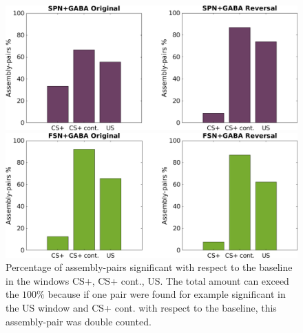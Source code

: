 \begin{figure}
    \centering
    \includegraphics[scale=0.36]{figures/SPN_GABAHisto.png}
    
    \vspace{1cm}
    
    \includegraphics[scale=0.36]{figures/FSN_GABAHisto.png}
    \caption{Percentage of assembly-pairs significant with respect to the baseline in the windows CS+, CS+ cont., US. The total amount can exceed the $100\%$ because if one pair were found for example significant in the US window and CS+ cont. with respect to the baseline, this assembly-pair was double counted.}
    \label{fig:FriedHistoGABA}
\end{figure}\\
\pagebreak
